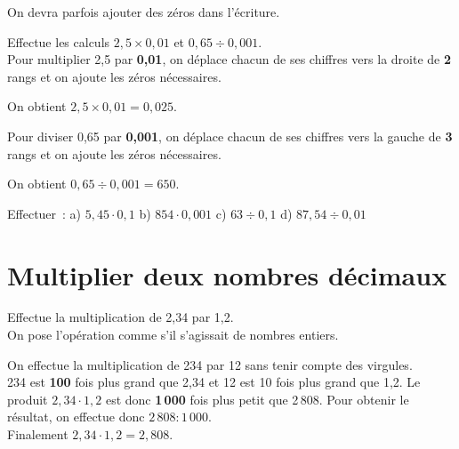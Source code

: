 \begin{remarque}
On devra parfois ajouter des zéros dans l'écriture.
\end{remarque}

\begin{exemple*1}
Effectue les calculs $2,5 \times 0,01$ et $0,65 \div 0,001$.\\[1em]
Pour multiplier 2,5 par \textcolor{B1}{\textbf{0,01}}, on déplace chacun de ses chiffres vers la droite de \textcolor{B1}{\textbf{2}} rangs et on ajoute les zéros nécessaires. 

On obtient $2,5 \times 0,01 = 0,025$.

Pour diviser 0,65 par \textcolor{J1}{\textbf{0,001}}, on déplace chacun de ses chiffres vers la gauche de \textcolor{J1}{\textbf{3}} rangs et on ajoute les zéros nécessaires. 

On obtient $0,65 \div 0,001 = 650$. 
\end{exemple*1}


Effectuer : a) $5,45 \cdot 0,1$ \hfill b) $854 \cdot 0,001$ \hfill c) $63 \div 0,1$ \hfill d) $87,54 \div 0,01$

\section{Multiplier deux nombres décimaux}

\begin{exemple*1}
Effectue la multiplication de 2,34 par 1,2.\\[1em]

On pose l'opération comme s'il s'agissait de nombres entiers. 

On effectue la multiplication de 234 par 12 sans tenir compte des virgules.\\[0.75em]
234 est \textcolor{B1}{\textbf{100}} fois plus grand que 2,34 et 12 est 10 fois plus grand que 1,2. Le produit $2,34 \cdot 1,2$ est donc \textcolor{J1}{\textbf{1\,000}} fois plus petit que 2\,808. Pour obtenir le résultat, on effectue donc $2\,808 : 1\,000$.\\[0.75em]
Finalement $2,34 \cdot 1,2 = 2,808$.
\end{exemple*1}


